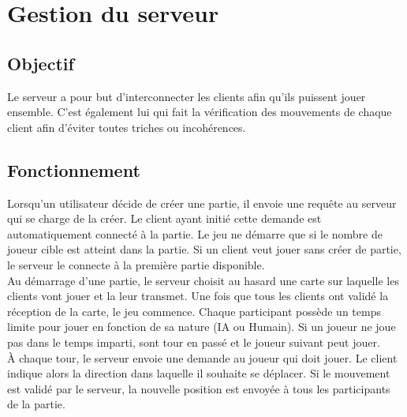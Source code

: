 \chapter{Gestion du serveur}

    \section{Objectif}
        Le serveur a pour but d'interconnecter les clients afin qu'ils puissent jouer ensemble. C'est également lui qui fait la vérification des mouvements de chaque client afin d'éviter toutes triches ou incohérences.

    \section{Fonctionnement}
        Lorsqu'un utilisateur décide de créer une partie, il envoie une requête au serveur qui se charge de la créer. Le client ayant initié cette demande est automatiquement connecté à la partie. Le jeu ne démarre que si le nombre de joueur cible est atteint dans la partie. Si un client veut jouer sans créer de partie, le serveur le connecte à la première partie disponible.\\

        Au démarrage d'une partie, le serveur choisit au hasard une carte sur laquelle les clients vont jouer et la leur transmet. Une fois que tous les clients ont validé la réception de la carte, le jeu commence. Chaque participant possède un temps limite pour jouer en fonction de sa nature (IA ou Humain). Si un joueur ne joue pas dans le temps imparti, sont tour en passé et le joueur suivant peut jouer.\\

        À chaque tour, le serveur envoie une demande au joueur qui doit jouer. Le client indique alors la direction dans laquelle il souhaite se déplacer. Si le mouvement est validé par le serveur, la nouvelle position est envoyée à tous les participants de la partie.
